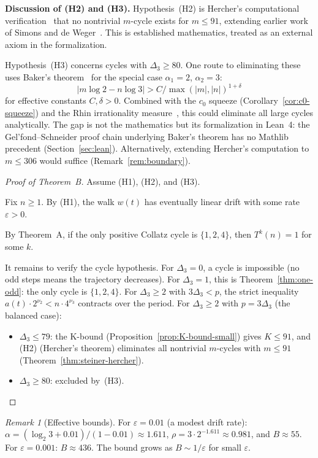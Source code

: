 \documentclass[manuscript]{aomart}
\theoremstyle{plain}
\theoremstyle{definition}
\theoremstyle{remark}
\newtheorem{remark}[theorem]{Remark}
\numberwithin{equation}{section}
\begin{document}
\medskip\noindent
\textbf{Discussion of (H2) and (H3).}
Hypothesis~(H2) is Hercher's computational verification~\cite{Hercher2024}
that no nontrivial $m$-cycle exists for $m \le 91$, extending earlier
work of Simons and de Weger~\cite{SimonsDeWeger2005}.  This is
established mathematics, treated as an external axiom in the
formalization.

Hypothesis~(H3) concerns cycles with $\Delta_3 \ge 80$.  One route to
eliminating these uses Baker's theorem~\cite{Baker1975} for the
special case $\alpha_1 = 2$, $\alpha_2 = 3$:
\[
  |m \log 2 - n \log 3| > C / \max(|m|, |n|)^{1+\delta}
\]
for effective constants $C, \delta > 0$.  Combined with the $c_0$
squeeze (Corollary~\ref{cor:c0-squeeze}) and the Rhin irrationality
measure~\cite{Rhin1987}, this could eliminate all large cycles
analytically.  The gap is not the mathematics but its formalization in
Lean~4: the Gel'fond--Schneider proof chain underlying Baker's theorem
has no Mathlib precedent (Section~\ref{sec:lean}).  Alternatively,
extending Hercher's computation to $m \le 306$ would suffice
(Remark~\ref{rem:boundary}).

\begin{proof}[Proof of Theorem~B]
Assume (H1), (H2), and (H3).

Fix $n \ge 1$.  By (H1), the walk $w(t)$ has eventually linear
drift with some rate $\varepsilon > 0$.

By Theorem~A, if the only positive Collatz cycle is $\{1, 2, 4\}$,
then $T^k(n) = 1$ for some $k$.

It remains to verify the cycle hypothesis.  For $\Delta_3 = 0$,
a cycle is impossible (no odd steps means the trajectory decreases).
For $\Delta_3 = 1$, this is Theorem~\ref{thm:one-odd}: the only
cycle is $\{1,2,4\}$.
For $\Delta_3 \ge 2$ with $3\Delta_3 < p$, the strict inequality
$a(t) \cdot 2^{\nu_2} < n \cdot 4^{\nu_3}$ contracts over the period.
For $\Delta_3 \ge 2$ with $p = 3\Delta_3$ (the balanced case):
\begin{itemize}
  \item $\Delta_3 \le 79$: the K-bound
    (Proposition~\ref{prop:K-bound-small}) gives $K \le 91$, and
    (H2) (Hercher's theorem) eliminates all nontrivial $m$-cycles
    with $m \le 91$ (Theorem~\ref{thm:steiner-hercher}).
  \item $\Delta_3 \ge 80$: excluded by~(H3).
\end{itemize}
\end{proof}

\begin{remark}[Effective bounds]\label{rem:effective}
For $\varepsilon = 0.01$ (a modest drift rate):
$\alpha = (\log_2 3 + 0.01)/(1 - 0.01) \approx 1.611$,
$\rho = 3 \cdot 2^{-1.611} \approx 0.981$,
and $B \approx 55$.
For $\varepsilon = 0.001$:
$B \approx 436$.
The bound grows as $B \sim 1/\varepsilon$ for small $\varepsilon$.
\end{remark}
\end{document}
